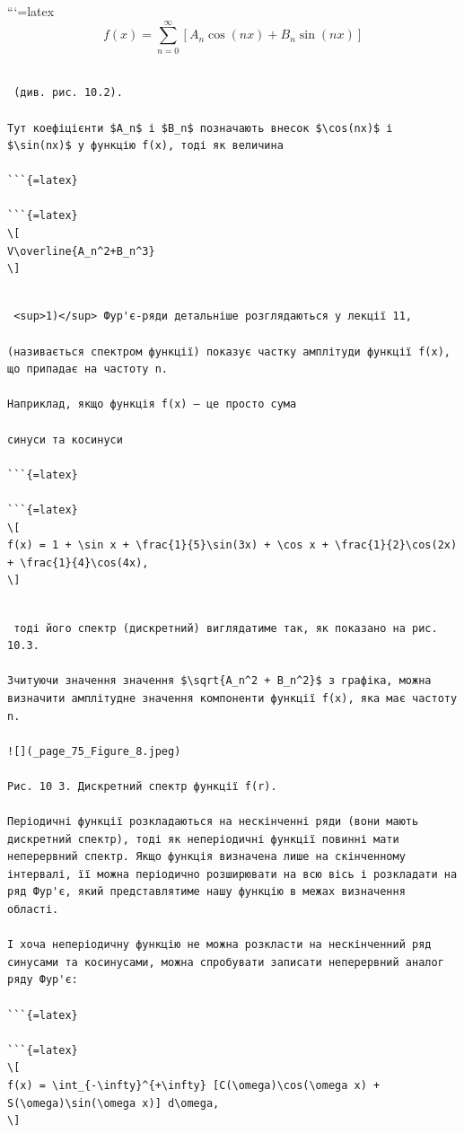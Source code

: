 \documentclass[
  ukrainian,
]{article}
\begin{document}
```{=latex}
\[
f(x) = \sum_{n=0}^{\infty} \left[ A_n \cos(nx) + B_n \sin(nx) \right]
\]

\begin{verbatim}

 (див. рис. 10.2).

Тут коефіцієнти $A_n$ і $B_n$ позначають внесок $\cos(nx)$ і $\sin(nx)$ у функцію f(x), тоді як величина

```{=latex}

```{=latex}
\[
V\overline{A_n^2+B_n^3}
\]
\end{verbatim}

\begin{verbatim}

 <sup>1)</sup> Фур'є-ряди детальніше розглядаються у лекції 11,

(називається спектром функції) показує частку амплітуди функції f(x), що припадає на частоту n.

Наприклад, якщо функція f(x) — це просто сума

синуси та косинуси

```{=latex}

```{=latex}
\[
f(x) = 1 + \sin x + \frac{1}{5}\sin(3x) + \cos x + \frac{1}{2}\cos(2x) + \frac{1}{4}\cos(4x),
\]
\end{verbatim}

\begin{verbatim}

 тоді його спектр (дискретний) виглядатиме так, як показано на рис. 10.3.

Зчитуючи значення значення $\sqrt{A_n^2 + B_n^2}$ з графіка, можна визначити амплітудне значення компоненти функції f(x), яка має частоту n.

![](_page_75_Figure_8.jpeg)

Рис. 10 3. Дискретний спектр функції f(r).

Періодичні функції розкладаються на нескінченні ряди (вони мають дискретний спектр), тоді як неперіодичні функції повинні мати неперервний спектр. Якщо функція визначена лише на скінченному інтервалі, її можна періодично розширювати на всю вісь і розкладати на ряд Фур'є, який представлятиме нашу функцію в межах визначення області.

І хоча неперіодичну функцію не можна розкласти на нескінченний ряд синусами та косинусами, можна спробувати записати неперервний аналог ряду Фур'є:

```{=latex}

```{=latex}
\[
f(x) = \int_{-\infty}^{+\infty} [C(\omega)\cos(\omega x) + S(\omega)\sin(\omega x)] d\omega,
\]
\end{verbatim}
\end{document}
